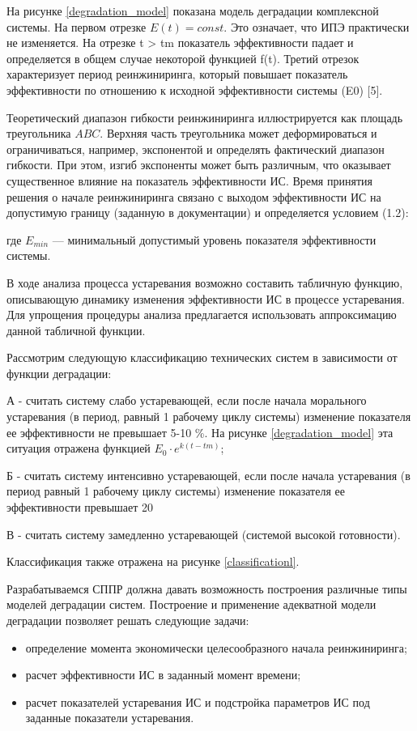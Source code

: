 На рисунке \ref{degradation_model} показана модель деградации комплексной системы. 
На первом отрезке $E(t) = const$. 
Это означает, что ИПЭ практически не изменяется. 
На отрезке t > tm показатель эффективности падает и определяется в общем случае некоторой функцией f(t). 
Третий отрезок характеризует период реинжиниринга, который повышает показатель эффективности по отношению к исходной эффективности системы (E0) [5].


Теоретический диапазон гибкости реинжиниринга иллюстрируется как площадь треугольника $ABC$. Верхняя часть треугольника может деформироваться и ограничиваться, например, экспонентой и определять фактический диапазон гибкости. При этом, изгиб экспоненты может быть различным, что оказывает существенное влияние на показатель эффективности ИС. Время принятия решения о начале реинжиниринга связано с выходом эффективности ИС на допустимую границу (заданную в документации) и определяется условием (1.2):

где	$E_{min}$ — минимальный допустимый уровень показателя эффективности системы.

В ходе анализа процесса устаревания возможно составить табличную функцию, описывающую динамику изменения эффективности ИС в процессе устаревания. 
Для упрощения процедуры анализа предлагается использовать аппроксимацию данной табличной функции.

Рассмотрим следующую классификацию технических систем в зависимости от функции деградации:

А - считать систему слабо устаревающей, если после начала морального устаревания (в период, равный 1 рабочему циклу системы) изменение
показателя ее эффективности не превышает 5-10 \%. 
На рисунке \ref{degradation_model} эта ситуация отражена функцией $E_0 \cdot e^{k(t−tm)}$;

Б - считать систему интенсивно устаревающей, если после начала устаревания (в период равный 1 рабочему циклу системы) изменение показателя ее эффективности превышает 20%

В - считать систему замедленно устаревающей (системой высокой готовности). 

Классификация также отражена на рисунке \ref{classificationl}.

 
Разрабатываемся СППР должна давать возможность построения различные типы моделей деградации систем. 
Построение и применение адекватной модели деградации позволяет решать следующие задачи:
\begin{itemize}
  \item определение момента экономически целесообразного начала реинжиниринга;
  \item расчет эффективности ИС в заданный момент времени;
  \item расчет показателей устаревания ИС и подстройка параметров ИС под заданные показатели устаревания.
\end{itemize}

